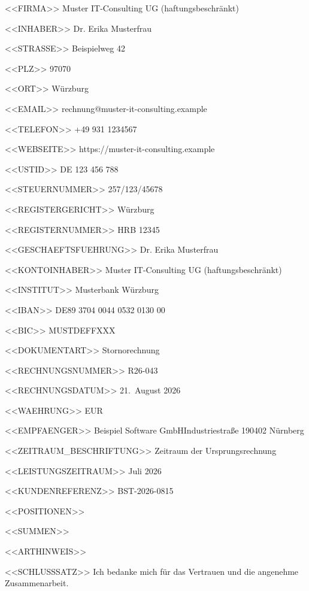<<FIRMA>>
Muster IT-Consulting UG (haftungsbeschränkt)

<<INHABER>>
Dr. Erika Musterfrau

<<STRASSE>>
Beispielweg 42

<<PLZ>>
97070

<<ORT>>
Würzburg

<<EMAIL>>
rechnung@muster-it-consulting.example

<<TELEFON>>
+49 931 1234567

<<WEBSEITE>>
https://muster-it-consulting.example

<<USTID>>
DE 123 456 788

<<STEUERNUMMER>>
257/123/45678

<<REGISTERGERICHT>>
Würzburg

<<REGISTERNUMMER>>
HRB 12345

<<GESCHAEFTSFUEHRUNG>>
Dr. Erika Musterfrau

<<KONTOINHABER>>
Muster IT-Consulting UG (haftungsbeschränkt)

<<INSTITUT>>
Musterbank Würzburg

<<IBAN>>
DE89 3704 0044 0532 0130 00

<<BIC>>
MUSTDEFFXXX

<<DOKUMENTART>>
Stornorechnung

<<RECHNUNGSNUMMER>>
R26-043

<<RECHNUNGSDATUM>>
21.~August 2026

<<WAEHRUNG>>
EUR

<<EMPFAENGER>>
Beispiel Software GmbH\zeilenwechsel{}Industriestraße 1\zeilenwechsel{}90402 Nürnberg

<<ZEITRAUM_BESCHRIFTUNG>>
Zeitraum der Ursprungsrechnung

<<LEISTUNGSZEITRAUM>>
Juli 2026

<<KUNDENREFERENZ>>
BST-2026-0815

<<POSITIONEN>>
 \positionstrenner{}

<<SUMMEN>>
   \summentrenner{}

<<ARTHINWEIS>>

<<SCHLUSSSATZ>>
Ich bedanke mich für das Vertrauen und die angenehme Zusammenarbeit.
